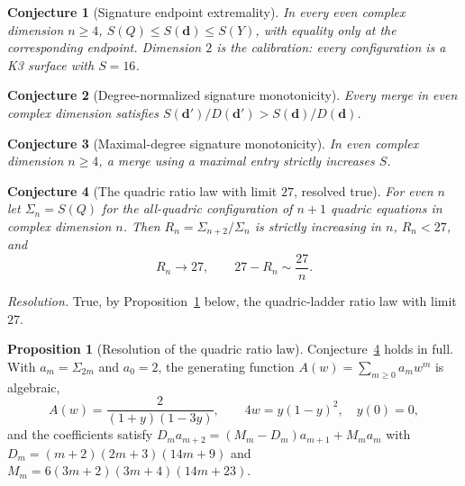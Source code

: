 \documentclass[11pt]{article}
\newtheorem{conjecture}{Conjecture}
\theoremstyle{definition}
\newtheorem{proposition}{Proposition}
\begin{document}
\begin{conjecture}[Signature endpoint extremality]\label{aa16}
In every even complex dimension $n\ge4$, $S(Q)\le S(\mathbf d)\le S(Y)$, with equality only at the corresponding endpoint.  Dimension $2$ is the calibration: every configuration is a K3 surface with $S=16$.
\end{conjecture}

\begin{conjecture}[Degree-normalized signature monotonicity]\label{aa17}
Every merge in even complex dimension satisfies $S(\mathbf d')/D(\mathbf d')>S(\mathbf d)/D(\mathbf d)$.
\end{conjecture}

\begin{conjecture}[Maximal-degree signature monotonicity]\label{aa18}
In even complex dimension $n\ge4$, a merge using a maximal entry strictly increases $S$.
\end{conjecture}

\begin{conjecture}[The quadric ratio law with limit $27$, resolved true]\label{aa19}
For even $n$ let $\Sigma_n=S(Q)$ for the all-quadric configuration of $n+1$ quadric equations in complex dimension $n$.  Then $R_n=\Sigma_{n+2}/\Sigma_n$ is strictly increasing in $n$, $R_n<27$, and
\[
R_n\to27,\qquad 27-R_n\sim\frac{27}{n}.
\]
\end{conjecture}

\emph{Resolution.} True, by Proposition~\ref{aa:quad} below, the quadric-ladder ratio law with limit $27$.

\begin{proposition}[Resolution of the quadric ratio law]\label{aa:quad}
Conjecture~\ref{aa19} holds in full.  With $a_m=\Sigma_{2m}$ and $a_0=2$, the generating function $A(w)=\sum_{m\ge0}a_mw^m$ is algebraic,
\[
A(w)=\frac{2}{(1+y)(1-3y)},\qquad 4w=y(1-y)^2,\quad y(0)=0,
\]
and the coefficients satisfy $D_ma_{m+2}=(M_m-D_m)a_{m+1}+M_ma_m$ with $D_m=(m+2)(2m+3)(14m+9)$ and $M_m=6(3m+2)(3m+4)(14m+23)$.
\end{proposition}
\end{document}
